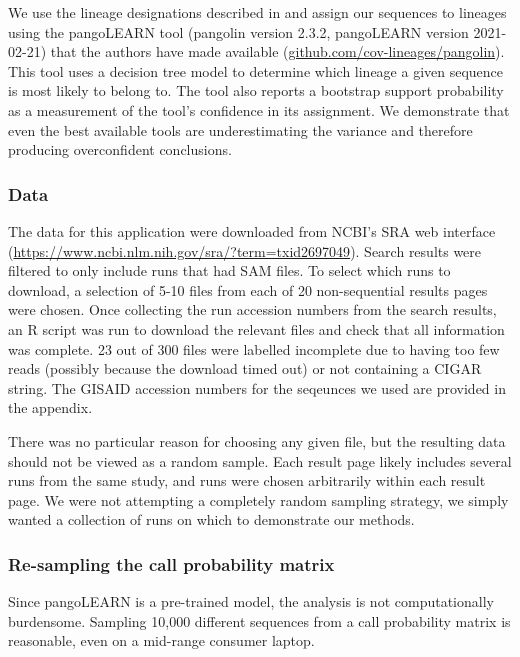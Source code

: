 \documentclass[
]{article}
\begin{document}
We use the lineage designations described in
\citet{rambautDynamicNomenclatureProposal2020} and assign our sequences
to lineages using the pangoLEARN tool (pangolin version 2.3.2,
pangoLEARN version 2021-02-21) that the authors have made available
(\url{github.com/cov-lineages/pangolin}). This tool uses a decision tree
model to determine which lineage a given sequence is most likely to
belong to. The tool also reports a bootstrap support probability as a
measurement of the tool's confidence in its assignment. We demonstrate
that even the best available tools are underestimating the variance and
therefore producing overconfident conclusions.

\hypertarget{data}{%
\subsubsection{Data}\label{data}}

The data for this application were downloaded from NCBI's SRA web
interface (\url{https://www.ncbi.nlm.nih.gov/sra/?term=txid2697049}).
Search results were filtered to only include runs that had SAM files. To
select which runs to download, a selection of 5-10 files from each of 20
non-sequential results pages were chosen. Once collecting the run
accession numbers from the search results, an R script was run to
download the relevant files and check that all information was complete.
23 out of 300 files were labelled incomplete due to having too few reads
(possibly because the download timed out) or not containing a CIGAR
string. The GISAID accession numbers for the seqeunces we used are
provided in the appendix.

There was no particular reason for choosing any given file, but the
resulting data should not be viewed as a random sample. Each result page
likely includes several runs from the same study, and runs were chosen
arbitrarily within each result page. We were not attempting a completely
random sampling strategy, we simply wanted a collection of runs on which
to demonstrate our methods.

\hypertarget{re-sampling-the-call-probability-matrix}{%
\subsubsection{Re-sampling the call probability
matrix}\label{re-sampling-the-call-probability-matrix}}

Since pangoLEARN is a pre-trained model, the analysis is not
computationally burdensome. Sampling 10,000 different sequences from a
call probability matrix is reasonable, even on a mid-range consumer
laptop.
\end{document}
